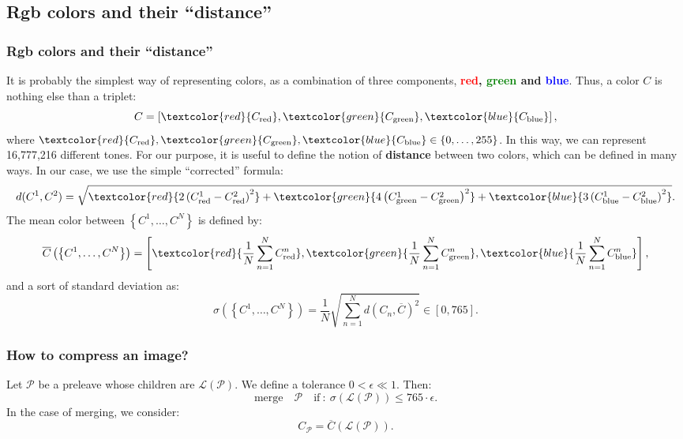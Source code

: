 \documentclass[8pt]{beamer}
\begin{document}
\subsection{Rgb colors and their ``distance''}
\begin{frame}
 \frametitle{Rgb colors and their ``distance''}
 \pause
 It is probably the simplest way of representing colors, as a combination of three components, \textbf{\textcolor{red}{red}, \textcolor{green}{green} and \textcolor{blue}{blue}}.
 Thus, a color $C$ is nothing else than a triplet:
 \begin{equation*}
  C = \left [ \textcolor{red}{C_{\text{red}}}, \textcolor{green}{C_{\text{green}}}, \textcolor{blue}{C_{\text{blue}}} \right ],
 \end{equation*}
where $\textcolor{red}{C_{\text{red}}},\textcolor{green}{C_{\text{green}}},\textcolor{blue}{C_{\text{blue}}} \in \{0,\dots, 255 \}$. In this way, we can represent 16,777,216 different tones.
 \pause
 For our purpose, it is useful to define the notion of \textbf{distance} between two colors, which can be defined in many ways. In our case, we use the simple ``corrected'' formula:
 \begin{equation*}
  d(C^1,C^2) = \sqrt{\textcolor{red}{2 \left (C^1_{\text{red}}-C^2_{\text{red}} \right )^2} + \textcolor{green}{4 \left (C^1_{\text{green}}-C^2_{\text{green}} \right )^2} + \textcolor{blue}{3 \left (C^1_{\text{blue}}-C^2_{\text{blue}} \right )^2}}.
 \end{equation*}\pause
The mean color between $\left \{ C^1, \dots, C^N\right \} $ is defined by:
\begin{equation*}
 \overline{C} \left ( \left \{ C^1, \dots, C^N\right \} \right ) = \left[ \textcolor{red}{\frac{1}{N} \sum_{n=1}^N C_{\text{red}}^n}, \textcolor{green}{\frac{1}{N} \sum_{n=1}^N C_{\text{green}}^n},\textcolor{blue}{ \frac{1}{N} \sum_{n=1}^N C_{\text{blue}}^n}\right ],
\end{equation*}\pause
and a sort of standard deviation as:
\begin{equation*}
 \sigma  \left ( \left \{ C^1, \dots, C^N\right \} \right ) = \frac{1}{N} \sqrt{\sum_{n=1}^N d(C_n,\overline{C})^2} \in [0,765].
\end{equation*}
\end{frame}

\begin{frame}
 \frametitle{How to compress an image?}
 \pause
 Let $\mathcal{P}$ be a preleave whose children are $\mathcal{L}(\mathcal{P})$. We define a tolerance $0< \epsilon \ll 1$. Then:
 \begin{equation*}
  \text{merge} \quad \mathcal{P} \quad \text{if} ~ : ~ \sigma  \left ( \mathcal{L}(\mathcal{P}) \right ) \leq 765 \cdot \epsilon.
 \end{equation*}\pause
In the case of merging, we consider:
\begin{equation*}
 C_{\mathcal{P}} = \overline{C} \left ( \mathcal{L}(\mathcal{P}) \right ).
\end{equation*}

\end{frame}
\end{document}

